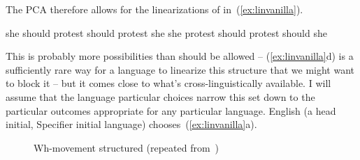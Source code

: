\documentclass[output=paper]{langsci/langscibook}
\begin{document}
The \gls{PCA} therefore allows for the linearizations of  in~(\ref{ex:linvanilla}).
\begin{exe}
	\ex \label{ex:linvanilla}
	\begin{xlist}
		\ex she should protest
		\ex should protest she
		\ex she protest should
		\ex protest should she
	\end{xlist}
\end{exe}

This is probably more possibilities than should be allowed -- (\ref{ex:linvanilla}d) is a sufficiently rare way for a language to linearize this structure that we might want to block it -- but it comes close to what's cross-linguistically available. I will assume that the language particular choices narrow this set down to the particular outcomes appropriate for any particular language. English (a head initial, Specifier initial language) chooses~(\ref{ex:linvanilla}a).

\begin{figure}
    \caption{\label{ex:multi3-2}Wh-movement structured (repeated
    from~)}
\end{figure}
\end{document}
